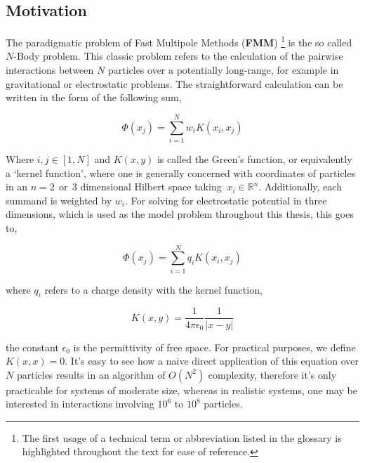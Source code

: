 \subsection{Motivation}
The paradigmatic problem of Fast Multipole Methods (\textbf{\gls{FMM}})
\footnote{The first usage of a technical term or abbreviation listed in the
glossary is highlighted throughout the text for ease of reference.} is the so
called $N$-Body problem. This classic problem refers to the calculation of the pairwise
interactions between $N$ particles over a potentially long-range, for example in
gravitational or electrostatic problems. The straightforward calculation can be
written in the form of the following sum,

\begin{equation}
\Phi(x_j) = \sum_{i=1}^N w_i K(x_i, x_j)
\label{eq:n_body_problem}
\end{equation}

Where $i, j \in [1,N]$ and $K(x, y)$ is called the Green's function, or equivalently
a `kernel function', where one is generally concerned with coordinates of particles in an
$n=2 \> \> \text{or} \> \> 3$ dimensional Hilbert space taking  $\ x_i \in \mathbb{R}^n$.
Additionally, each summand is weighted by $w_i$. For solving for electrostatic
potential in three dimensions, which is used as the model problem throughout this
thesis, this goes to,

\begin{equation}
\Phi(x_j) = \sum_{i=1}^N q_iK(x_i, x_j)
\label{eq:electrostatic_paradigm}
\end{equation}

where $q_i$ refers to a charge density with the kernel function,

\begin{equation}
    K(x, y) = \frac{1}{4\pi \epsilon_0}\frac{1}{| x - y |}
\label{eq:laplace_kernel}
\end{equation}

the constant $\epsilon_0$ is the permittivity of free space. For practical
purposes, we define $K(x,x) = 0$. It's easy to see
how a naive direct application of this equation over $N$ particles
results in an algorithm of $O(N^2)$ complexity, therefore it's only practicable
for systems of moderate size, whereas in realistic systems, one may be interested in
interactions involving $10^{6}$ to $10^8$ particles.

